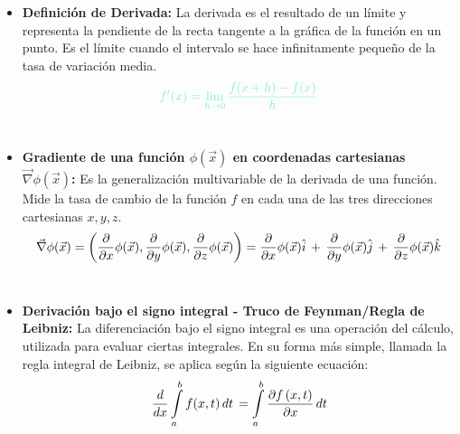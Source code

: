 \documentclass[letterpaper, 12pt]{article}
\begin{document}
    \begin{itemize}\renewcommand{\labelitemi}{$\vartheta$}
    
         \item \textbf{Definición de Derivada:} La derivada es el resultado de un límite y representa la pendiente de la recta tangente a la gráfica de la función en un punto. Es el límite cuando el intervalo se hace infinitamente pequeño de la tasa de variación media.\\
         
         
        
            \begin{equation*}
                \textcolor {mygreen}{f'(x) = \lim\limits_{h\rightarrow 0} \frac{f(x+h)-f(x)}{h}}
            \end{equation*}\\

            
        \item \textbf{Gradiente de una función $\phi (\Vec{x})$ en coordenadas cartesianas $\Vec{\nabla} \phi (\Vec{x})$:} Es la generalización multivariable de la derivada de una función. Mide la tasa de cambio de la función $f$ en cada una de las tres direcciones cartesianas $x, y, z$. \\
        
            \begin{equation*}
                \Vec{\nabla} \phi (\Vec{x}) = \left( \frac{\partial}{\partial x} \phi (\Vec{x}), \frac{\partial}{\partial y} \phi (\Vec{x}), \frac{\partial}{\partial z} \phi (\Vec{x}) \right) = \frac{\partial}{\partial x} \phi (\Vec{x}) \hat{i} \thinspace + \thinspace \frac{\partial}{\partial y} \phi (\Vec{x}) \hat{j} \thinspace + \thinspace \frac{\partial}{\partial z} \phi (\Vec{x}) \hat{k}
            \end{equation*}\\
            
         \item \textbf{Derivación bajo el signo integral - Truco de Feynman/Regla de Leibniz:} La diferenciación bajo el signo integral es una operación del cálculo, utilizada para evaluar ciertas integrales. En su forma más simple, llamada la regla integral de Leibniz, se aplica según la siguiente ecuación: \\
        
            \begin{equation*}
                \frac{d}{dx} \int\limits_{a}^{b} f(x,t) \thinspace dt \thinspace = \int\limits_{a}^{b} \frac{\partial f \thinspace (x,t)}{\partial x} \thinspace dt
            \end{equation*}\\
            

\end{itemize}
\end{document}
